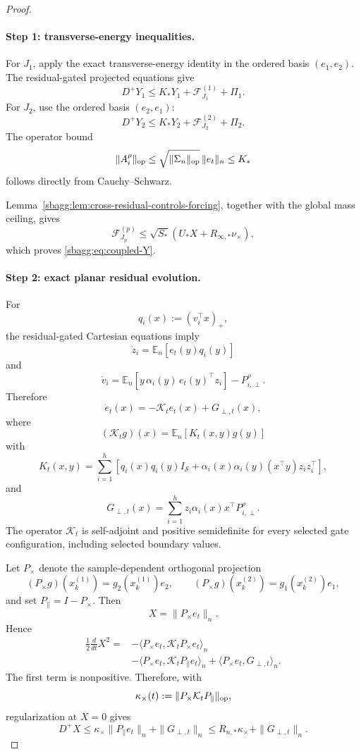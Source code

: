 \documentclass{article} %
\theoremstyle{plain}
\theoremstyle{definition}
\theoremstyle{remark}
\begin{document}
\begin{proof}\leavevmode

\paragraph{Step 1: transverse-energy inequalities.}

For $J_1$, apply the exact transverse-energy identity in the ordered basis
$(e_1,e_2)$.  The residual-gated projected equations give
\[
D^+Y_1
\le
K_*Y_1+\mathcal F_{J_1}^{(1)}+\Pi_1.
\]
For $J_2$, use the ordered basis $(e_2,e_1)$:
\[
D^+Y_2
\le
K_*Y_2+\mathcal F_{J_2}^{(2)}+\Pi_2.
\]
The operator bound
\[
\|A_i^\rho\|_{\rm op}
\le
\sqrt{\|\Sigma_n\|_{\rm op}}\,
\|e_t\|_n
\le K_*
\]
follows directly from Cauchy--Schwarz.

Lemma~\ref{sbagg:lem:cross-residual-controls-forcing}, together with the global
mass ceiling, gives
\[
\mathcal F_{J_p}^{(p)}
\le
\sqrt{S_*}
\left(
U_*X+R_{\infty,*}\nu_\times
\right),
\]
which proves \eqref{sbagg:eq:coupled-Y}.

\paragraph{Step 2: exact planar residual evolution.}

For
\[
q_i(x):=(v_i^\top x)_+,
\]
the residual-gated Cartesian equations imply
\[
\dot z_i
=
\mathbb E_n[e_t(y)q_i(y)]
\]
and
\[
\dot v_i
=
\mathbb E_n[
y\,\alpha_i(y)\,e_t(y)^\top z_i]
-
P_{i,\perp}^\rho.
\]
Therefore
\[
\dot e_t(x)
=
-\mathcal K_t e_t(x)
+
G_{\perp,t}(x),
\]
where
\[
(\mathcal K_tg)(x)
=
\mathbb E_n[K_t(x,y)g(y)]
\]
with
\[
\boxed{
K_t(x,y)
=
\sum_{i=1}^h
\left[
q_i(x)q_i(y)I_{\mathcal S}
+
\alpha_i(x)\alpha_i(y)
(x^\top y)z_i z_i^\top
\right],
}
\tag{selected-ntk}
\label{sbagg:eq:selected-ntk}
\]
and
\[
\boxed{
G_{\perp,t}(x)
=
\sum_{i=1}^h
z_i\alpha_i(x)
x^\top P_{i,\perp}^\rho.
}
\tag{perp-residual-forcing}
\label{sbagg:eq:perp-residual-forcing}
\]
The operator $\mathcal K_t$ is self-adjoint and positive semidefinite for
every selected gate configuration, including selected boundary values.

Let $P_\times$ denote the sample-dependent orthogonal projection
\[
(P_\times g)(x_k^{(1)})
=
g_2(x_k^{(1)})e_2,
\qquad
(P_\times g)(x_k^{(2)})
=
g_1(x_k^{(2)})e_1,
\]
and set $P_\parallel=I-P_\times$.  Then
\[
X=\|P_\times e_t\|_n.
\]
Hence
\[
\begin{aligned}
\frac12\frac d{dt}X^2
={}&
-\langle P_\times e_t,
\mathcal K_tP_\times e_t\rangle_n
\\
&-
\langle P_\times e_t,
\mathcal K_tP_\parallel e_t\rangle_n
+
\langle P_\times e_t,G_{\perp,t}\rangle_n .
\end{aligned}
\]
The first term is nonpositive.  Therefore, with
\[
\kappa_\times(t)
:=
\|P_\times\mathcal K_tP_\parallel\|_{\rm op},
\]
regularization at $X=0$ gives
\[
D^+X
\le
\kappa_\times\|P_\parallel e_t\|_n
+
\|G_{\perp,t}\|_n
\le
R_{n,*}\kappa_\times
+
\|G_{\perp,t}\|_n.
\]


\end{proof}
\end{document}
